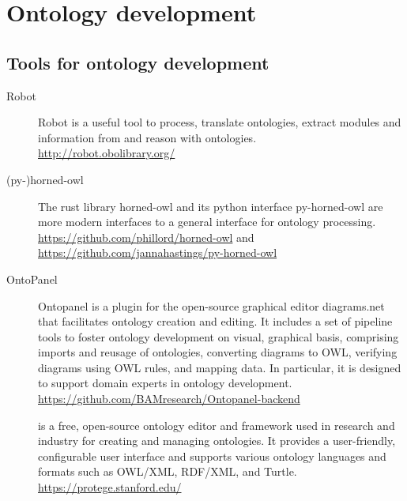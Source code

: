 \section{Ontology development}








\subsection{Tools for ontology development}

\begin{description}
    \item[Robot] Robot is a useful tool to process, translate ontologies, extract modules and information from and reason with ontologies.\\ \url{http://robot.obolibrary.org/}
    \item[(py-)horned-owl] The rust library horned-owl and its python interface py-horned-owl are more modern interfaces to a general interface for ontology processing. \\ \url{https://github.com/phillord/horned-owl} and \\ \url{https://github.com/jannahastings/py-horned-owl}
    \item[OntoPanel] Ontopanel is a plugin for the open-source graphical editor diagrams.net that facilitates ontology creation and editing. It includes a set of pipeline tools to foster ontology development on visual, graphical basis, comprising imports and reusage of ontologies, converting diagrams to OWL, verifying diagrams using OWL rules, and mapping data. \cite{ChenOntopanel2022} In particular, it is designed to support domain experts in ontology development. \\ \url{https://github.com/BAMresearch/Ontopanel-backend}
    \item[{\protege}] {\protege} is a free, open-source ontology editor and framework used in research and industry for creating and managing ontologies. It provides a user-friendly, configurable user interface and supports various ontology languages and formats such as OWL/XML, RDF/XML, and Turtle. \\ \url{https://protege.stanford.edu/}
\end{description}


